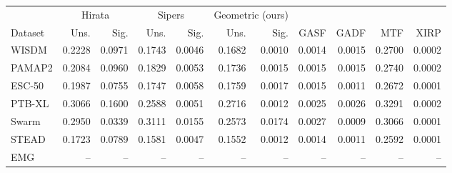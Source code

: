 \begin{tabular}{@{}lrrrrrrrrrr@{}}
\toprule
& \multicolumn{2}{c}{Hirata} & \multicolumn{2}{c}{Sipers} & \multicolumn{2}{c}{Geometric (ours)} & & & & \\
\cmidrule(lr){2-3}\cmidrule(lr){4-5}\cmidrule(lr){6-7}
Dataset & Uns. & Sig. & Uns. & Sig. & Uns. & Sig. & GASF & GADF & MTF & XIRP \\
\midrule
WISDM & 0.2228 & 0.0971 & 0.1743 & 0.0046 & 0.1682 & 0.0010 & 0.0014 & 0.0015 & 0.2700 & 0.0002 \\
PAMAP2 & 0.2084 & 0.0960 & 0.1829 & 0.0053 & 0.1736 & 0.0015 & 0.0015 & 0.0015 & 0.2740 & 0.0002 \\
ESC-50 & 0.1987 & 0.0755 & 0.1747 & 0.0058 & 0.1759 & 0.0017 & 0.0015 & 0.0011 & 0.2672 & 0.0001 \\
PTB-XL & 0.3066 & 0.1600 & 0.2588 & 0.0051 & 0.2716 & 0.0012 & 0.0025 & 0.0026 & 0.3291 & 0.0002 \\
Swarm & 0.2950 & 0.0339 & 0.3111 & 0.0155 & 0.2573 & 0.0174 & 0.0027 & 0.0009 & 0.3066 & 0.0001 \\
STEAD & 0.1723 & 0.0789 & 0.1581 & 0.0047 & 0.1552 & 0.0012 & 0.0014 & 0.0011 & 0.2592 & 0.0001 \\
EMG & -- & -- & -- & -- & -- & -- & -- & -- & -- & -- \\
\bottomrule
\end{tabular}
